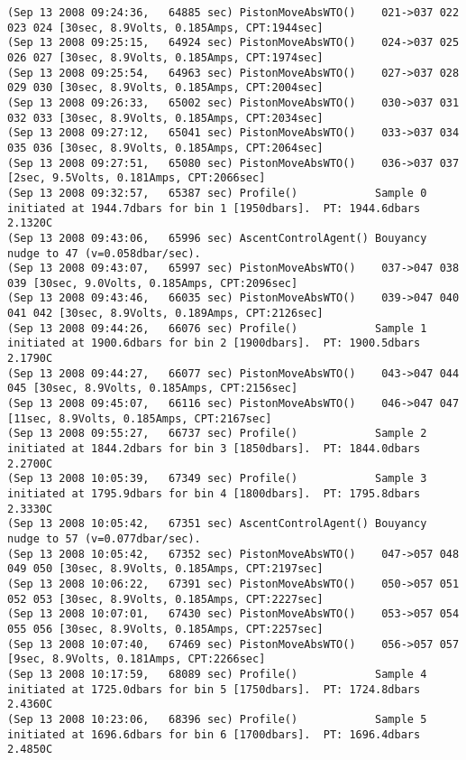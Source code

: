 {\begin{verbatim}
(Sep 13 2008 09:24:36,   64885 sec) PistonMoveAbsWTO()    021->037 022 023 024 [30sec, 8.9Volts, 0.185Amps, CPT:1944sec]
(Sep 13 2008 09:25:15,   64924 sec) PistonMoveAbsWTO()    024->037 025 026 027 [30sec, 8.9Volts, 0.185Amps, CPT:1974sec]
(Sep 13 2008 09:25:54,   64963 sec) PistonMoveAbsWTO()    027->037 028 029 030 [30sec, 8.9Volts, 0.185Amps, CPT:2004sec]
(Sep 13 2008 09:26:33,   65002 sec) PistonMoveAbsWTO()    030->037 031 032 033 [30sec, 8.9Volts, 0.185Amps, CPT:2034sec]
(Sep 13 2008 09:27:12,   65041 sec) PistonMoveAbsWTO()    033->037 034 035 036 [30sec, 8.9Volts, 0.185Amps, CPT:2064sec]
(Sep 13 2008 09:27:51,   65080 sec) PistonMoveAbsWTO()    036->037 037 [2sec, 9.5Volts, 0.181Amps, CPT:2066sec]
(Sep 13 2008 09:32:57,   65387 sec) Profile()            Sample 0 initiated at 1944.7dbars for bin 1 [1950dbars].  PT: 1944.6dbars 2.1320C
(Sep 13 2008 09:43:06,   65996 sec) AscentControlAgent() Bouyancy nudge to 47 (v=0.058dbar/sec).
(Sep 13 2008 09:43:07,   65997 sec) PistonMoveAbsWTO()    037->047 038 039 [30sec, 9.0Volts, 0.185Amps, CPT:2096sec]
(Sep 13 2008 09:43:46,   66035 sec) PistonMoveAbsWTO()    039->047 040 041 042 [30sec, 8.9Volts, 0.189Amps, CPT:2126sec]
(Sep 13 2008 09:44:26,   66076 sec) Profile()            Sample 1 initiated at 1900.6dbars for bin 2 [1900dbars].  PT: 1900.5dbars 2.1790C
(Sep 13 2008 09:44:27,   66077 sec) PistonMoveAbsWTO()    043->047 044 045 [30sec, 8.9Volts, 0.185Amps, CPT:2156sec]
(Sep 13 2008 09:45:07,   66116 sec) PistonMoveAbsWTO()    046->047 047 [11sec, 8.9Volts, 0.185Amps, CPT:2167sec]
(Sep 13 2008 09:55:27,   66737 sec) Profile()            Sample 2 initiated at 1844.2dbars for bin 3 [1850dbars].  PT: 1844.0dbars 2.2700C
(Sep 13 2008 10:05:39,   67349 sec) Profile()            Sample 3 initiated at 1795.9dbars for bin 4 [1800dbars].  PT: 1795.8dbars 2.3330C
(Sep 13 2008 10:05:42,   67351 sec) AscentControlAgent() Bouyancy nudge to 57 (v=0.077dbar/sec).
(Sep 13 2008 10:05:42,   67352 sec) PistonMoveAbsWTO()    047->057 048 049 050 [30sec, 8.9Volts, 0.185Amps, CPT:2197sec]
(Sep 13 2008 10:06:22,   67391 sec) PistonMoveAbsWTO()    050->057 051 052 053 [30sec, 8.9Volts, 0.185Amps, CPT:2227sec]
(Sep 13 2008 10:07:01,   67430 sec) PistonMoveAbsWTO()    053->057 054 055 056 [30sec, 8.9Volts, 0.185Amps, CPT:2257sec]
(Sep 13 2008 10:07:40,   67469 sec) PistonMoveAbsWTO()    056->057 057 [9sec, 8.9Volts, 0.181Amps, CPT:2266sec]
(Sep 13 2008 10:17:59,   68089 sec) Profile()            Sample 4 initiated at 1725.0dbars for bin 5 [1750dbars].  PT: 1724.8dbars 2.4360C
(Sep 13 2008 10:23:06,   68396 sec) Profile()            Sample 5 initiated at 1696.6dbars for bin 6 [1700dbars].  PT: 1696.4dbars 2.4850C

\end{verbatim}}
